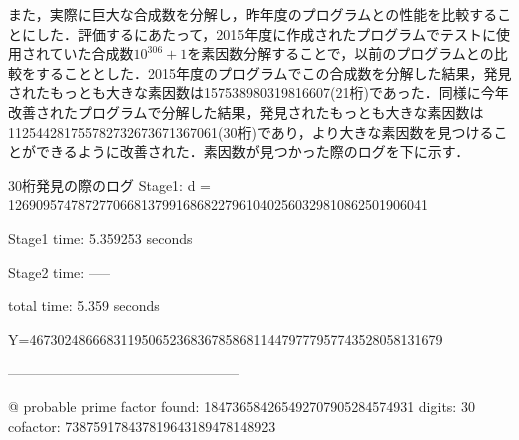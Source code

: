 \documentclass[openany,11pt,papersize]{jsbook}
\begin{document}
また，実際に巨大な合成数を分解し，昨年度のプログラムとの性能を比較することにした．評価するにあたって，2015年度に作成されたプログラムでテストに使用されていた合成数$10^{306}+1$を素因数分解することで，以前のプログラムとの比較をすることとした．2015年度のプログラムでこの合成数を分解した結果，発見されたもっとも大きな素因数は157538980319816607(21桁)であった．同様に今年改善されたプログラムで分解した結果，発見されたもっとも大きな素因数は112544281755782732673671367061(30桁)であり，より大きな素因数を見つけることができるように改善された．素因数が見つかった際のログを下に示す．
 
\begin{itembox}[H]{30桁発見の際のログ}
Stage1: d = 126909574787277066813799168682279610402560329810862501906041

Stage1 time: 5.359253 seconds

Stage2 time: -----

total time: 5.359 seconds

Y=46730248666831195065236836785868114479777957743528058131679

--------------------------------------------------

@ probable prime factor found: 184736584265492707905284574931  digits: 30 cofactor: 738759178437819643189478148923
\end{itembox}

\end{document}
